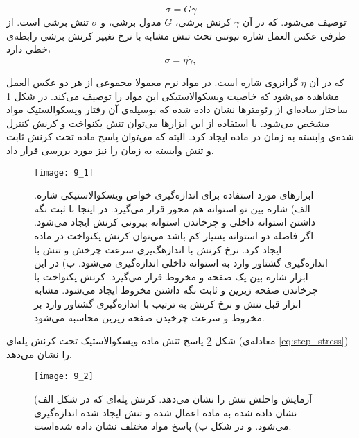 \begin{equation}
\sigma=G\gamma
\label{eq:elastic}
\end{equation}
توصیف می‌شود. که در آن $\gamma$ کرنش برشی، $G$ مدول برشی، و $\sigma$ تنش برشی است. از طرفی عکس العمل شاره نیوتنی تحت تنش مشابه با نرخ تغییر کرنش برشی رابطه‌ی خطی دارد،
\begin{equation}
\sigma=\eta\dot\gamma,
\label{eq:visco}
\end{equation}

که در آن $\eta$ گرانروی شاره است. در مواد نرم معمولا مجموعی از هر دو عکس العمل مشاهده می‌شود که خاصیت ویسکوالاستیکی این مواد را توصیف می‌کند. در شکل \ref{fig:rheo} ساختار ساده‌ای از رئومترها نشان داده شده که بوسیله‌ی آن رفتار ویسکوالستیک مواد مشخص می‌شود. با استفاده از این ابزارها می‌توان تنش یکنواخت و کرنش کنترل شده‌ی وابسته به زمان در ماده ایجاد کرد. البته که می‌توان پاسخ ماده تحت کرنش ثابت و تنش وابسته به زمان را نیز مورد بررسی قرار داد.
\begin{figure}[htbp]
\begin{center}
\texttt{[image: 9\_1]}
\caption{
ابزارهای مورد استفاده برای اندازه‌گیری خواص ویسکوالاستیکی شاره‌. الف) شاره بین تو استوانه هم محور قرار می‌گیرد. در اینجا با ثبت نگه داشتن استوانه داخلی و چرخاندن استوانه بیرونی کرنش ایجاد می‌شود. اگر فاصله دو استوانه بسیار کم  باشد می‌توان کرنش یکنواخت در ماده ایجاد کرد. نرخ کرنش با اندازهگ‌یری سرعت چرخش و تنش با اندازه‌گیری گشتاور وارد به استوانه داخلی اندازه‌گیری می‌شود. ب) در این ابزار شاره بین یک صفحه و مخروط قرار می‌گیرد. کرنش یکنواخت با چرخاندن صفحه زیرین و ثابت نگه داشتن مخروط ایجاد می‌شود. مشابه ابزار قبل تنش و نرخ کرنش به ترتیب با اندازه‌گیری گشتاور وارد بر مخروط و سرعت چرخیدن صفحه زیرین محاسبه می‌شود.
}
\label{fig:rheo}
\end{center}
\end{figure}
شکل \ref{fig:relax} پاسخ تنش ماده ویسکوالاستیک تحت کرنش پله‌ای (معادله‌ی \ref{eq:step_stress}) را نشان می‌دهد.
\begin{figure}[htbp]
\begin{center}
\texttt{[image: 9\_2]}
\caption{
آزمایش واحلش تنش را نشان می‌دهد. کرنش پله‌ای که در شکل الف) نشان داده شده به ماده اعمال شده و تنش ایجاد شده اندازه‌گیری می‌شود. و در شکل ب) پاسخ مواد مختلف نشان داده ‌شده‌است.
}
\label{fig:relax}
\end{center}
\end{figure}

